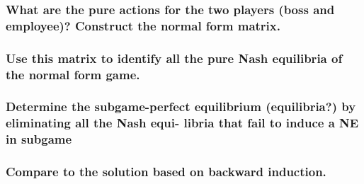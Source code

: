 \subsubsection{What are the pure actions for the two players (boss and employee)? Construct the normal
form matrix.}

\subsubsection{Use this matrix to identify all the pure Nash equilibria of the normal form game.}

\subsubsection{Determine the subgame-perfect equilibrium (equilibria?) by eliminating all the Nash equi-
libria that fail to induce a NE in subgame}

\subsubsection{Compare to the solution based on backward induction.}